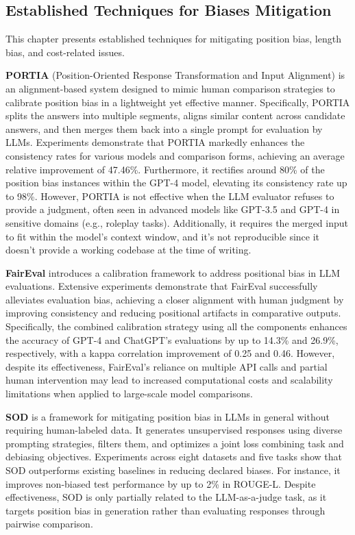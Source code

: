 \documentclass[sigconf, authoryear]{acmart}
\begin{document}
\subsection{Established Techniques for Biases Mitigation}\label{subsec:established-techniques-for-bias-mitigation}

This chapter presents established techniques for mitigating position bias, length bias, and cost-related issues.

\textbf{PORTIA} (Position-Oriented Response Transformation and Input Alignment) is an alignment-based system designed to mimic human comparison strategies to calibrate position bias in a lightweight yet effective manner.
Specifically, PORTIA splits the answers into multiple segments, aligns similar content across candidate answers, and then merges them back into a single prompt for evaluation by LLMs.
Experiments demonstrate that PORTIA markedly enhances the consistency rates for various models and comparison forms, achieving an average relative improvement of 47.46\%.
Furthermore, it rectifies around 80\% of the position bias instances within the GPT-4 model, elevating its consistency rate up to 98\%.
However, PORTIA is not effective when the LLM evaluator refuses to provide a judgment, often seen in advanced models like GPT-3.5 and GPT-4 in sensitive domains (e.g., roleplay tasks).
Additionally, it requires the merged input to fit within the model’s context window, and it's not reproducible since it doesn't provide a working codebase at the time of writing\cite{portia}.

\textbf{FairEval} introduces a calibration framework to address positional bias in LLM evaluations.
Extensive experiments demonstrate that FairEval successfully alleviates evaluation bias, achieving a closer alignment with human judgment by improving consistency and reducing positional artifacts in comparative outputs.
Specifically, the combined calibration strategy using all the components enhances the accuracy of GPT-4 and ChatGPT’s evaluations by up to 14.3\% and 26.9\%, respectively, with a kappa correlation improvement of 0.25 and 0.46.
However, despite its effectiveness, FairEval's reliance on multiple API calls and partial human intervention may lead to increased computational costs and scalability limitations when applied to large-scale model comparisons\cite{faireval}.

\textbf{SOD} is a framework for mitigating position bias in LLMs in general without requiring human-labeled data.
It generates unsupervised responses using diverse prompting strategies, filters them, and optimizes a joint loss combining task and debiasing objectives.
Experiments across eight datasets and five tasks show that SOD outperforms existing baselines in reducing declared biases.
For instance, it improves non-biased test performance by up to 2\% in ROUGE-L\@.
Despite effectiveness, SOD is only partially related to the LLM-as-a-judge task, as it targets position bias in generation rather than evaluating responses through pairwise comparison\cite{liu2024selfsupervisedpositiondebiasinglarge}.
\end{document}

